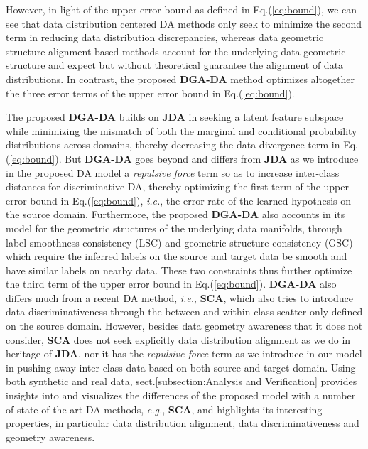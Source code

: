 \documentclass[journal,twocolumn]{IEEEtran}
\begin{document}
\begin{CJK*}{UTF8}{gkai}
However, in light of the upper error bound as defined in Eq.(\ref{eq:bound}), we can see that data distribution centered DA methods only seek to minimize the second term in reducing data distribution discrepancies,  whereas data geometric structure alignment-based methods account for the underlying data geometric structure and expect but without theoretical guarantee the alignment of data distributions. In contrast, the proposed \textbf{DGA-DA} method optimizes altogether the three error terms of the upper error bound in Eq.(\ref{eq:bound}). 

The proposed \textbf{DGA-DA} builds on \textbf{JDA} \cite{long2013transfer} in seeking a latent feature subspace while minimizing the mismatch of both the marginal and conditional probability distributions across domains, thereby decreasing the data divergence term in Eq.(\ref{eq:bound}). But \textbf{DGA-DA} goes beyond and differs from \textbf{JDA} as we introduce in the proposed DA model a \textit{repulsive force} term so as to increase inter-class distances for discriminative DA, thereby optimizing the first term of the upper error bound in Eq.(\ref{eq:bound}), \textit{i.e.},  the error rate of the learned hypothesis on the source domain. Furthermore, the proposed \textbf{DGA-DA} also accounts in its model for the  geometric structures of the underlying data manifolds, through label smoothness consistency (LSC) and geometric structure consistency (GSC) which require the inferred labels on the source and target data be smooth and have similar labels on nearby data. These two constraints thus further optimize the third term of the upper error bound in Eq.(\ref{eq:bound}). \textbf{DGA-DA} also differs much from a recent DA method, \textit{i.e.}, \textbf{SCA}\cite{DBLP:journals/pami/GhifaryBKZ17}, which also tries to introduce data discriminativeness through the between and within class scatter only defined on the source domain. However, besides data geometry awareness that it does not consider, \textbf{SCA} does not seek explicitly data distribution alignment as we do in heritage of \textbf{JDA}, nor it has the \textit{repulsive force} term as we introduce in our model in pushing away inter-class data based on both source and target domain.  Using both synthetic and real data, sect.\ref{subsection:Analysis and Verification} provides insights into and visualizes the differences of the proposed model with a number of state of the art DA methods, \textit{e.g.}, \textbf{SCA},  and highlights its interesting properties, in particular data distribution alignment, data discriminativeness and geometry awareness.     



\end{CJK*}
\end{document}
